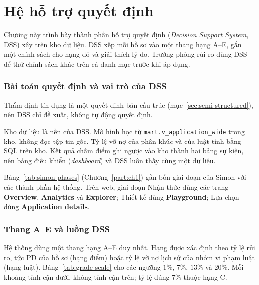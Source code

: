\part{Hệ hỗ trợ quyết định}
\label{part:ch4}
\begingroup
\sloppy

Chương này trình bày thành phần hỗ trợ quyết định (\textit{Decision Support System}, DSS) xây trên kho dữ liệu. DSS xếp mỗi hồ sơ vào một thang hạng A--E, gắn một chính sách cho hạng đó và giải thích lý do. Trưởng phòng rủi ro dùng DSS để thử chính sách khác trên cả danh mục trước khi áp dụng.

\section{Bài toán quyết định và vai trò của DSS}
\label{sec:dss-problem}

Thẩm định tín dụng là một quyết định bán cấu trúc (mục~\ref{sec:semi-structured}), nên DSS chỉ đề xuất, không tự động quyết định.

\medskip

Kho dữ liệu là nền của DSS. Mô hình học từ \texttt{mart.v\_application\_wide} trong kho, không đọc tập tin gốc. Tỷ lệ vỡ nợ của phân khúc và của luật tính bằng SQL trên kho. Kết quả chấm điểm ghi ngược vào kho thành hai bảng sự kiện, nên bảng điều khiển (\textit{dashboard}) và DSS luôn thấy cùng một dữ liệu.

\medskip

Bảng~\ref{tab:simon-phases} (Chương~\ref{part:ch1}) gắn bốn giai đoạn của Simon với các thành phần hệ thống. Trên web, giai đoạn Nhận thức dùng các trang \textbf{Overview}, \textbf{Analytics} và \textbf{Explorer}; Thiết kế dùng \textbf{Playground}; Lựa chọn dùng \textbf{Application details}.

\section{Thang A--E và luồng DSS}
\label{sec:dss-flow}

Hệ thống dùng một thang hạng A--E duy nhất. Hạng được xác định theo tỷ lệ rủi ro, tức PD của hồ sơ (hạng điểm) hoặc tỷ lệ vỡ nợ lịch sử của nhóm vi phạm luật (hạng luật). Bảng~\ref{tab:grade-scale} cho các ngưỡng $1\%$, $7\%$, $13\%$ và $20\%$. Mỗi khoảng tính cận dưới, không tính cận trên; tỷ lệ đúng $7\%$ thuộc hạng C.

